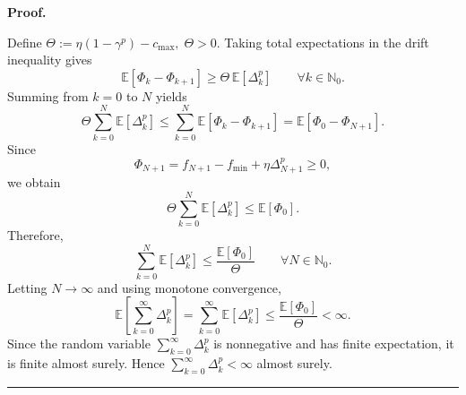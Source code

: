\documentclass[11pt,a4paper]{article}
\newenvironment{proof}[1][Proof]{%
  \par\noindent\textbf{#1.}\ %
}{%
  \par\vspace{-0.5 ex}            %
  \noindent\hfill\rule{0.5em}{0.5em}\par
  \vspace{1ex}
}
\newcommand{\Dexp}{p}
\newcommand{\sara}[1]{{\color{red}{\textbf{[SS: #1]}}\color{black}}}
\newcommand{\Ant}[1]{\textcolor{magenta}{#1}}
\begin{document}
\begin{proof}
Define \(\Theta := \eta(1-\gamma^{\Dexp})-c_{\max}, \;\Theta>0\). Taking total expectations in the drift inequality gives
\[
    \mathbb E[\Phi_k-\Phi_{k+1}]
    \ge
    \Theta\,\mathbb E[\Delta_k^{\Dexp}]
    \qquad \forall k\in\mathbb N_0 .
\]
Summing from $k=0$ to $N$ yields
\[
    \Theta\sum_{k=0}^{N}\mathbb E[\Delta_k^{\Dexp}]
    \le
    \sum_{k=0}^{N}\mathbb E[\Phi_k-\Phi_{k+1}]
    =
    \mathbb E[\Phi_0-\Phi_{N+1}] .
\]
Since
\[
    \Phi_{N+1}
    =
    f_{N+1}-f_{\min}
    +
    \eta\Delta_{N+1}^{\Dexp}
    \ge 0,
\]
we obtain
\[
    \Theta\sum_{k=0}^{N}\mathbb E[\Delta_k^{\Dexp}]
    \le
    \mathbb E[\Phi_0].
\]
Therefore,
\[
    \sum_{k=0}^{N}\mathbb E[\Delta_k^{\Dexp}]
    \le
    \frac{\mathbb E[\Phi_0]}{\Theta}
    \qquad \forall N\in\mathbb N_0 .
\]
Letting $N\to\infty$ and using monotone convergence,
\[
    \mathbb E\!\left[
        \sum_{k=0}^{\infty}\Delta_k^{\Dexp}
    \right]
    =
    \sum_{k=0}^{\infty}\mathbb E[\Delta_k^{\Dexp}]
    \le
    \frac{\mathbb E[\Phi_0]}{\Theta}
    <
    \infty .
\]
Since the random variable
\(
    \sum_{k=0}^{\infty}\Delta_k^{\Dexp}
\)
is nonnegative and has finite expectation, it is finite almost surely. Hence
\(
    \sum_{k=0}^{\infty}\Delta_k^{\Dexp}<\infty
\)
almost surely.

\end{proof}
\end{document}
